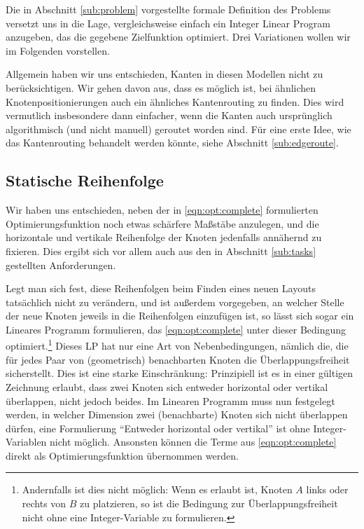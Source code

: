 Die in Abschnitt \ref{sub:problem} vorgestellte formale Definition des Problems versetzt uns in die Lage, vergleichsweise einfach ein Integer Linear Program anzugeben, das die gegebene Zielfunktion optimiert. Drei Variationen wollen wir im Folgenden vorstellen.

Allgemein haben wir uns entschieden, Kanten in diesen Modellen nicht zu berücksichtigen. Wir gehen davon aus, dass es möglich ist, bei ähnlichen Knotenpositionierungen auch ein ähnliches Kantenrouting zu finden. Dies wird vermutlich insbesondere dann einfacher, wenn die Kanten auch ursprünglich algorithmisch (und nicht manuell) geroutet worden sind. Für eine erste Idee, wie das Kantenrouting behandelt werden könnte, siehe Abschnitt \ref{sub:edgeroute}.

\subsection{Statische Reihenfolge}

Wir haben uns entschieden, neben der in \ref{eqn:opt:complete} formulierten Optimierungsfunktion noch etwas schärfere Maßstäbe anzulegen, und die horizontale und vertikale Reihenfolge der Knoten jedenfalls annähernd zu fixieren. Dies ergibt sich vor allem auch aus den in Abschnitt \ref{sub:tasks} gestellten Anforderungen.

Legt man sich fest, diese Reihenfolgen beim Finden eines neuen Layouts tatsächlich nicht zu verändern, und ist außerdem vorgegeben, an welcher Stelle der neue Knoten jeweils in die Reihenfolgen einzufügen ist, so lässt sich sogar ein Lineares Programm formulieren, das \ref{eqn:opt:complete} unter dieser Bedingung optimiert.\footnote{Andernfalls ist dies nicht möglich: Wenn es erlaubt ist, Knoten $A$ links oder rechts von $B$ zu platzieren, so ist die Bedingung zur Überlappungsfreiheit nicht ohne eine Integer-Variable zu formulieren.} Dieses LP hat nur eine Art von Nebenbedingungen, nämlich die, die für jedes Paar von (geometrisch) benachbarten Knoten die Überlappungsfreiheit sicherstellt. Dies ist eine starke Einschränkung: Prinzipiell ist es in einer gültigen Zeichnung erlaubt, dass zwei Knoten sich entweder horizontal oder vertikal überlappen, nicht jedoch beides. Im Linearen Programm muss nun festgelegt werden, in welcher Dimension zwei (benachbarte) Knoten sich nicht überlappen dürfen, eine Formulierung "`Entweder horizontal oder vertikal"' ist ohne Integer-Variablen nicht möglich. Ansonsten können die Terme aus \ref{eqn:opt:complete} direkt als Optimierungsfunktion übernommen werden.

